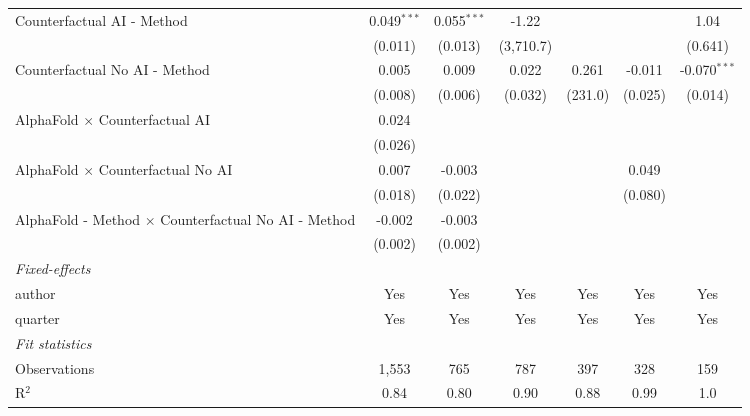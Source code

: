 \begin{tabular}{lcccccc}
   Counterfactual AI - Method                                 & 0.049$^{***}$ & 0.055$^{***}$ & -1.22     &          &         & 1.04\\   
                                                              & (0.011)       & (0.013)       & (3,710.7) &          &         & (0.641)\\   
   Counterfactual No AI - Method                              & 0.005         & 0.009         & 0.022     & 0.261    & -0.011  & -0.070$^{***}$\\   
                                                              & (0.008)       & (0.006)       & (0.032)   & (231.0)  & (0.025) & (0.014)\\   
   AlphaFold $\times$ Counterfactual AI                       & 0.024         &               &           &          &         &   \\   
                                                              & (0.026)       &               &           &          &         &   \\   
   AlphaFold $\times$ Counterfactual No AI                    & 0.007         & -0.003        &           &          & 0.049   &   \\   
                                                              & (0.018)       & (0.022)       &           &          & (0.080) &   \\   
   AlphaFold - Method $\times$ Counterfactual No AI - Method  & -0.002        & -0.003        &           &          &         &   \\   
                                                              & (0.002)       & (0.002)       &           &          &         &   \\   
   \midrule
   \emph{Fixed-effects}\\
   author                                                     & Yes           & Yes           & Yes       & Yes      & Yes     & Yes\\  
   quarter                                                    & Yes           & Yes           & Yes       & Yes      & Yes     & Yes\\  
   \midrule
   \emph{Fit statistics}\\
   Observations                                               & 1,553         & 765           & 787       & 397      & 328     & 159\\  
   R$^2$                                                      & 0.84          & 0.80          & 0.90      & 0.88     & 0.99    & 1.0\\  

\end{tabular}
